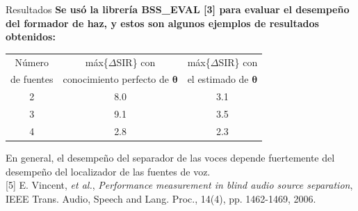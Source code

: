 \documentclass[12pt,aspectratio=169]{beamer}
\begin{document}
	\begin{frame}{Resultados}
		\textbf{Se usó la librería BSS\_EVAL [3] para evaluar el desempeño del formador de haz, y estos son algunos ejemplos de resultados obtenidos:}
		\begin{table}[H]
			\begin{center}
				\begin{tabular}{|c||c|c|}
					\hline Número & máx\{$\Delta$SIR\} con & máx\{$\Delta$SIR\} con \\ 
					de fuentes & conocimiento perfecto de $\pmb{\theta}$ & el estimado de $\pmb{\theta}$ \\ 
					\hline \hline 
					2 & 8.0 & 3.1 \\
					\hline 									 			
					3 & 9.1 & 3.5 \\
					\hline 									 			
					4 & 2.8 & 2.3  \\
					\hline 							
				\end{tabular}
			\end{center}
		\end{table}
		\vspace{-3mm}
		
		En general, el desempeño del separador de las voces depende fuertemente del desempeño del localizador de las fuentes de voz.\\
		\vspace{8mm}
		\color{black} \tiny{[5] E. Vincent, \textit{et al.}, \textit{Performance measurement in blind audio source separation}, IEEE Trans. Audio, Speech and Lang. Proc., 14(4), pp. 1462-1469, 2006.}
	\end{frame}
	
%	
	
\end{document}
